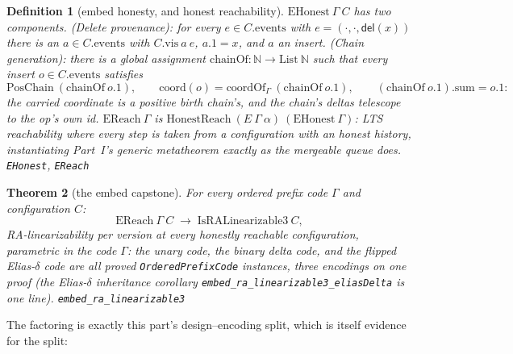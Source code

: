 \documentclass[11pt]{article}
\newtheorem{theorem}{Theorem}[section]
\newtheorem{definition}[theorem]{Definition}
\newcommand{\lean}[1]{\texttt{#1}}
\newcommand{\code}[1]{\texttt{#1}}
\newcommand{\del}{\mathsf{del}}
\begin{document}
\begin{definition}[embed honesty, and honest reachability]
\label{def:ehonest}
$\mathrm{EHonest}\ \Gamma\ C$ has two components.
(\emph{Delete provenance}): for every $e \in C.\mathrm{events}$ with
$e = (\cdot, \cdot, \del(x))$ there is an $a \in C.\mathrm{events}$
with $C.\mathrm{vis}\ a\ e$, $a.1 = x$, and $a$ an insert.
(\emph{Chain generation}): there is a global assignment
$\mathrm{chainOf} : \mathbb{N} \to \mathrm{List}\ \mathbb{N}$ such
that every insert $o \in C.\mathrm{events}$ satisfies
\[
  \mathrm{PosChain}\ (\mathrm{chainOf}\ o.1), \qquad
  \mathrm{coord}(o) = \mathrm{coordOf}_\Gamma\
  (\mathrm{chainOf}\ o.1), \qquad
  (\mathrm{chainOf}\ o.1).\mathrm{sum} = o.1 :
\]
the carried coordinate is a positive birth chain's, and the chain's
deltas telescope to the op's own id. $\mathrm{EReach}\ \Gamma$ is
$\mathrm{HonestReach}\ (E\ \Gamma\ \alpha)\ (\mathrm{EHonest}\
\Gamma)$: LTS reachability where every step is taken from a
configuration with an honest history, instantiating Part~I's generic
metatheorem exactly as the mergeable queue does.
\hfill\lean{EHonest}, \lean{EReach}
\end{definition}

\begin{theorem}[the embed capstone]
\label{thm:embedcapstone}
For every ordered prefix code $\Gamma$ and configuration $C$:
\[
  \mathrm{EReach}\ \Gamma\ C \;\to\; \mathrm{IsRALinearizable3}\ C ,
\]
RA-linearizability per version at every honestly reachable
configuration, \emph{parametric in the code} $\Gamma$: the unary
code, the binary delta code, and the flipped Elias-$\delta$ code are
all proved \code{OrderedPrefixCode} instances, three encodings on
one proof (the Elias-$\delta$ inheritance corollary
\lean{embed\_ra\_linearizable3\_eliasDelta} is one line).
\hfill\lean{embed\_ra\_linearizable3}
\end{theorem}

\noindent The factoring is exactly this
part's design--encoding split, which is itself evidence for the split:
\end{document}

